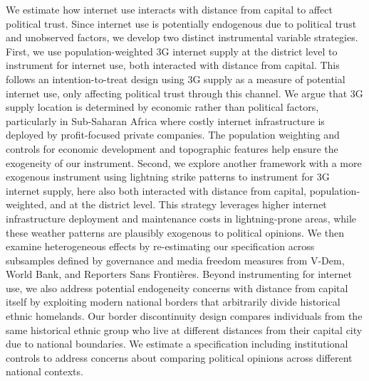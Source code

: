 \documentclass[11pt]{article}
\begin{document}
We estimate how internet use interacts with distance from capital to affect political trust.
Since internet use is potentially endogenous due to political trust and unobserved factors, we develop two distinct instrumental variable strategies.
First, we use population-weighted 3G internet supply at the district level to instrument for internet use, both interacted with distance from capital.
This follows an intention-to-treat design using 3G supply as a measure of potential internet use, only affecting political trust through this channel.
We argue that 3G supply location is determined by economic rather than political factors, particularly in Sub-Saharan Africa where costly internet infrastructure is deployed by profit-focused private companies.
The population weighting and controls for economic development and topographic features help ensure the exogeneity of our instrument.
Second, we explore another framework with a more exogenous instrument using lightning strike patterns to instrument for 3G internet supply, here also both interacted with distance from capital, population-weighted, and at the district level.
This strategy leverages higher internet infrastructure deployment and maintenance costs in lightning-prone areas, while these weather patterns are plausibly exogenous to political opinions.
We then examine heterogeneous effects by re-estimating our specification across subsamples defined by governance and media freedom measures from V-Dem, World Bank, and Reporters Sans Frontières.
Beyond instrumenting for internet use, we also address potential endogeneity concerns with distance from capital itself by exploiting modern national borders that arbitrarily divide historical ethnic homelands.
Our border discontinuity design compares individuals from the same historical ethnic group who live at different distances from their capital city due to national boundaries.
We estimate a specification including institutional controls to address concerns about comparing political opinions across different national contexts.\\
\end{document}
